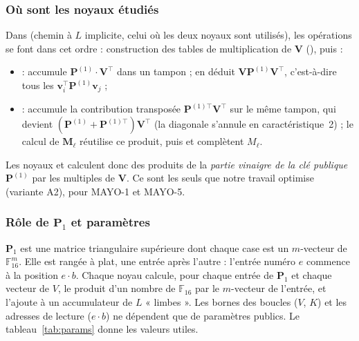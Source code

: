 \subsubsection{Où sont les noyaux étudiés}
Dans  (chemin à $L$ implicite, celui où les deux noyaux sont utilisés), les opérations se font dans cet ordre : construction des tables de multiplication de $\mathbf{V}$ (), puis :
\begin{itemize}[itemsep=1pt]
\item {} : accumule $\mathbf{P}^{(1)}\cdot\mathbf{V}^{\top}$ dans un tampon ;  en déduit $\mathbf{V}\mathbf{P}^{(1)}\mathbf{V}^{\top}$, c'est-à-dire tous les $\mathbf{v}_i^{\top}\mathbf{P}^{(1)}\mathbf{v}_j$ ;
\item {} : accumule la contribution transposée $\mathbf{P}^{(1)\top}\mathbf{V}^{\top}$ sur le même tampon, qui devient $(\mathbf{P}^{(1)}+\mathbf{P}^{(1)\top})\mathbf{V}^{\top}$ (la diagonale s'annule en caractéristique~2) ; le calcul de $\mathbf{M}_\ell$ réutilise ce produit, puis  et  complètent $M_\ell$.
\end{itemize}
Les noyaux  et  calculent donc des produits de la \emph{partie vinaigre de la clé publique} $\mathbf{P}^{(1)}$ par les multiples de $\mathbf{V}$. Ce sont les seuls que notre travail optimise (variante A2), pour MAYO-1 et MAYO-5.

\subsubsection{Rôle de $\mathbf{P}_1$ et paramètres}
$\mathbf{P}_1$ est une matrice triangulaire supérieure dont chaque case est un $m$-vecteur de $\mathbb{F}_{16}^m$. Elle est rangée à plat, une entrée après l'autre : l'entrée numéro $e$ commence à la position $e\cdot b$. Chaque noyau calcule, pour chaque entrée de $\mathbf{P}_1$ et chaque vecteur de $V$, le produit d'un nombre de $\mathbb{F}_{16}$ par le $m$-vecteur de l'entrée, et l'ajoute à un accumulateur de $L$ « limbes ». Les bornes des boucles ($V$, $K$) et les adresses de lecture ($e\cdot b$) ne dépendent que de paramètres publics. Le tableau~\ref{tab:params} donne les valeurs utiles.

